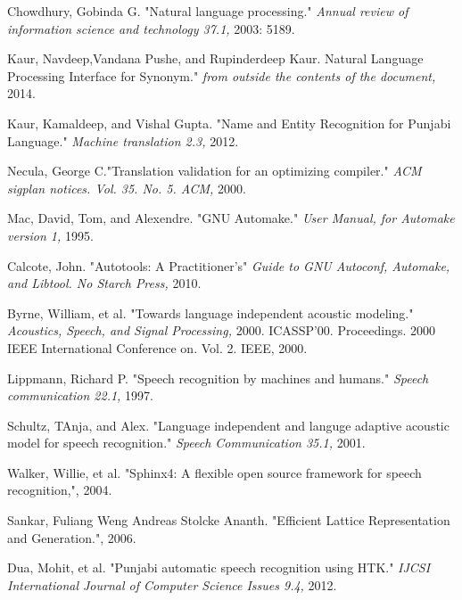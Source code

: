 \documentclass[12pt,a4paper,oldfontcommands]{memoir}
\begin{document}


%
%



\begin{thebibliography}{9}

Chowdhury, Gobinda G. 
"Natural language processing."
\textit{Annual review of information science and technology 37.1,} 2003: 5189.

Kaur, Navdeep,Vandana Pushe, and Rupinderdeep Kaur.
Natural Language Processing Interface for Synonym."
\textit{from outside the contents of the document,} 2014.

Kaur, Kamaldeep, and Vishal Gupta.
"Name and Entity Recognition for Punjabi Language."
\textit{Machine translation 2.3,} 2012.

Necula, George C."Translation validation for an optimizing compiler."
\textit{ACM sigplan notices. Vol. 35. No. 5. ACM,} 2000.


Mac, David, Tom, and Alexendre. "GNU Automake."
\textit{User Manual, for Automake version 1,} 1995.

 Calcote, John. "Autotools: A Practitioner's"
\textit{Guide to GNU Autoconf, Automake, and Libtool. No Starch Press,} 2010.

Byrne, William, et al. "Towards language independent acoustic modeling."
\textit{Acoustics, Speech, and Signal Processing,} 2000. ICASSP'00. Proceedings. 2000 IEEE International Conference on. Vol. 2. IEEE, 2000.

Lippmann, Richard P. "Speech recognition by machines and humans."
\textit{Speech communication 22.1,} 1997.

 Schultz, TAnja, and Alex. "Language independent and languge adaptive acoustic model for speech recognition."
\textit{Speech Communication 35.1,} 2001.

 Walker, Willie, et al. "Sphinx4: A flexible open source framework for speech recognition,", 2004.
\textit{}

Sankar, Fuliang Weng Andreas Stolcke Ananth. "Efficient Lattice Representation and Generation.", 2006.
\textit{}

 Dua, Mohit, et al. "Punjabi automatic speech recognition using HTK."
\textit{IJCSI International Journal of Computer Science Issues 9.4,} 2012.



\end{thebibliography}
\end{document}
